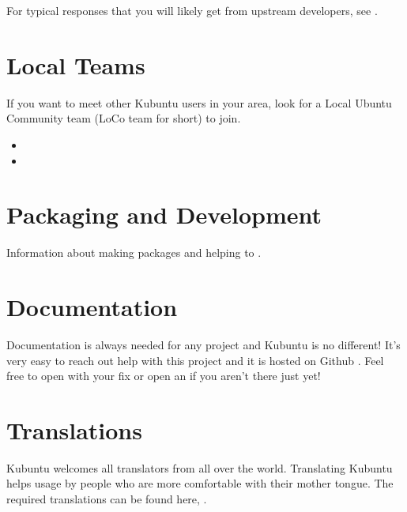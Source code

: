 \documentclass[letterpaper,10pt,english]{sphinxmanual}
\begin{document}
\sphinxAtStartPar
For typical responses that you will likely get from upstream  developers, see .


\section{Local Teams}
\label{\detokenize{docs/contribute:local-teams}}
\sphinxAtStartPar
If you want to meet other Kubuntu users in your area, look for a Local Ubuntu Community team (LoCo team for short) to join.
\begin{itemize}
\item {} 
\sphinxAtStartPar
{}

\item {} 
\sphinxAtStartPar
{}

\end{itemize}


\section{Packaging and Development}
\label{\detokenize{docs/contribute:packaging-and-development}}
\sphinxAtStartPar
Information about making packages and helping to .


\section{Documentation}
\label{\detokenize{docs/contribute:documentation}}
\sphinxAtStartPar
Documentation is always needed for any project and Kubuntu is no different! It’s very easy to reach out help with this project and it is hosted on Github . Feel free to open  with your fix or open an  if you aren’t there just yet!


\section{Translations}
\label{\detokenize{docs/contribute:translations}}
\sphinxAtStartPar
Kubuntu welcomes all translators from all over the world. Translating Kubuntu helps usage by people who are more comfortable with their mother tongue. The required translations can be found here, .
\end{document}
